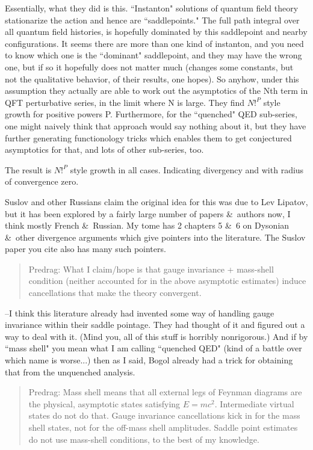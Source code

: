\begin{description}
Essentially, what they did is this.  ``Instanton" solutions of quantum
field theory stationarize the action and hence are ``saddlepoints."  The
full path integral over all quantum field histories, is hopefully
dominated by this saddlepoint and nearby configurations.  It seems there
are more than one kind of instanton, and you need to know which one is
the ``dominant" saddlepoint, and they may have the wrong one, but if so
it hopefully does not matter much (changes some constants, but not the
qualitative behavior, of their results, one hopes).  So anyhow, under
this assumption they actually are able to work out the asymptotics of the
Nth term in QFT perturbative series, in the limit where N is large.  They
find $N!^P$ style growth for positive powers P.  Furthermore, for the
``quenched" QED sub-series, one might naively think that approach would
say nothing about it, but they have further generating functionology
tricks which enables them to get conjectured asymptotics for that, and
lots of other sub-series, too.

The result is $N!^P$ style growth in all cases.
Indicating divergency and with radius of convergence zero.

Suslov and other Russians claim the original idea for this
was due to Lev Lipatov, but it has been explored by a fairly large number
of papers \&\ authors now, I think mostly French \&\ Russian.  My tome
has 2 chapters 5 \&\ 6 on Dysonian \&\ other divergence arguments which
give pointers into the literature.  The Suslov paper you cite also
has many such pointers.

\begin{quote} Predrag:
   What I claim/hope is that gauge invariance + mass-shell condition (neither
   accounted for in the above asymptotic estimates) induce cancellations that
   make the theory convergent.
\end{quote}

--I think this literature already had invented some way of handling
gauge invariance within their saddle pointage.   They had thought of
it and figured out a way to deal with it.
(Mind you, all of this stuff is horribly nonrigorous.)
And if by ``mass shell" you mean what I am calling ``quenched QED"
(kind of a battle over which name is worse...) then as I said, Bogol
already had a trick
for obtaining that from the unquenched analysis.

\begin{quote} Predrag:
Mass shell means that all external legs of Feynman diagrams are the
physical, asymptotic states satisfying $E = mc^2$. Intermediate virtual
states do not do that. Gauge invariance cancellations kick in for the
mass shell states, not for the off-mass shell amplitudes. Saddle point
estimates do not use mass-shell conditions, to the best of my knowledge.


\end{quote}
\end{description}
